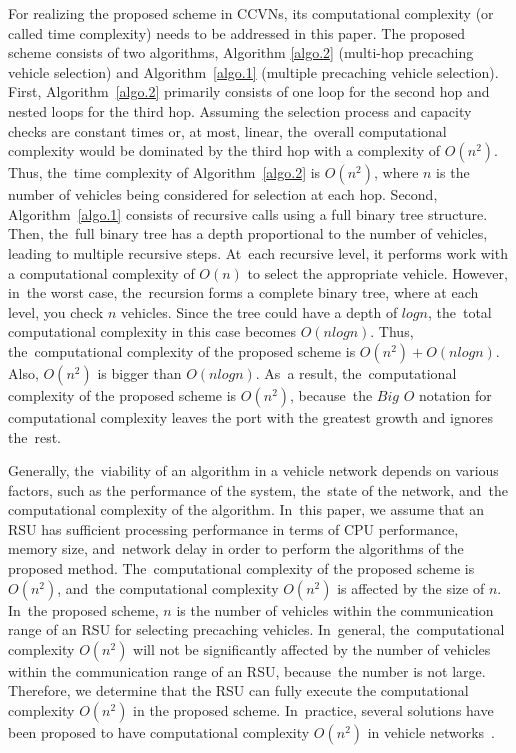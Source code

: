 \documentclass[electronics,aricle,accept,pdftex,moreauthors]{Definitions/mdpi}
\begin{document}
For realizing the proposed scheme in CCVNs, its computational complexity (or called time complexity) needs to be addressed in this paper.
The proposed scheme consists of two algorithms, Algorithm \ref{algo.2} (multi-hop precaching vehicle selection) and Algorithm~\ref{algo.1} (multiple precaching vehicle selection). First, Algorithm~\ref{algo.2} primarily consists of one loop for the second hop and nested loops for the third hop. Assuming the selection process and capacity checks are constant times or, at most, linear, the~overall computational complexity would be dominated by the third hop with a complexity of 
$O(n^{2})$. Thus, the~time complexity of Algorithm~\ref{algo.2} is $O(n^{2})$, where $n$ is the number of vehicles being considered for selection at each hop. Second, Algorithm~\ref{algo.1} consists of recursive calls using a full binary tree structure. Then, the~full binary tree has a depth proportional to the number of vehicles, leading to multiple recursive steps. At~each recursive level, it performs work with a computational complexity of $O(n)$ to select the appropriate vehicle. However, in~the worst case, the~recursion forms a complete binary tree, where at each level, you check $n$ vehicles. Since the tree could have a depth of $log n$, the~total computational complexity in this case becomes $O(nlog n)$. Thus, the~computational complexity of the proposed scheme is $O(n^{2}) + O(nlog n)$. Also, $O(n^{2})$ is bigger than $O(nlog n)$. As~a result, the~computational complexity of the proposed scheme is $O(n^{2})$, because~the $Big$ $O$ notation for computational complexity leaves the port with the greatest growth and ignores the~rest.

Generally, the~viability of an algorithm in a vehicle network depends on various factors, such as the performance of the system, the~state of the network, and~the computational complexity of the algorithm. In~this paper, we assume that an RSU has sufficient processing performance in terms of CPU performance, memory size, and~network delay in order to perform the algorithms of the proposed method. The~computational complexity of the proposed scheme is $O(n^{2})$, and~the computational complexity $O(n^{2})$ is affected by the size of $n$. In~the proposed scheme, $n$ is the number of vehicles within the communication range of an RSU for selecting precaching vehicles. In~general, the~computational complexity $O(n^{2})$ will not be significantly affected by the number of vehicles within the communication range of an RSU, because~the number is not large. Therefore, we determine that the RSU can fully execute the computational complexity $O(n^{2})$ in the proposed scheme. In~practice, several solutions have been proposed to have computational complexity $O(n^{2})$ in vehicle networks~\cite{Wu2020, Peyman2023}.
\end{document}
